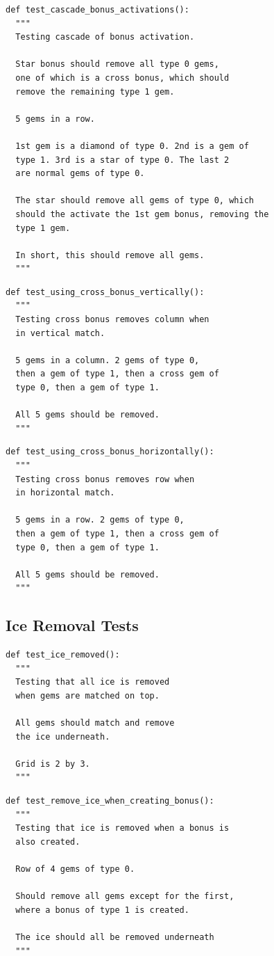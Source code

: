 \documentclass{bhamthesis}
\theoremstyle{definition}
\begin{document}
\begin{verbatim}
def test_cascade_bonus_activations():
  """
  Testing cascade of bonus activation.

  Star bonus should remove all type 0 gems,
  one of which is a cross bonus, which should
  remove the remaining type 1 gem.

  5 gems in a row.

  1st gem is a diamond of type 0. 2nd is a gem of
  type 1. 3rd is a star of type 0. The last 2
  are normal gems of type 0.

  The star should remove all gems of type 0, which
  should the activate the 1st gem bonus, removing the
  type 1 gem.

  In short, this should remove all gems.
  """
\end{verbatim}



\begin{verbatim}
def test_using_cross_bonus_vertically():
  """
  Testing cross bonus removes column when
  in vertical match.

  5 gems in a column. 2 gems of type 0,
  then a gem of type 1, then a cross gem of
  type 0, then a gem of type 1.

  All 5 gems should be removed.
  """
\end{verbatim}



\begin{verbatim}
def test_using_cross_bonus_horizontally():
  """
  Testing cross bonus removes row when
  in horizontal match.

  5 gems in a row. 2 gems of type 0,
  then a gem of type 1, then a cross gem of
  type 0, then a gem of type 1.

  All 5 gems should be removed.
  """
\end{verbatim}


\subsection{Ice Removal Tests}
\begin{verbatim}
def test_ice_removed():
  """
  Testing that all ice is removed
  when gems are matched on top.

  All gems should match and remove
  the ice underneath.

  Grid is 2 by 3.
  """
\end{verbatim}

\begin{verbatim}
def test_remove_ice_when_creating_bonus():
  """
  Testing that ice is removed when a bonus is
  also created.

  Row of 4 gems of type 0.

  Should remove all gems except for the first,
  where a bonus of type 1 is created.

  The ice should all be removed underneath
  """
\end{verbatim}
\end{document}
